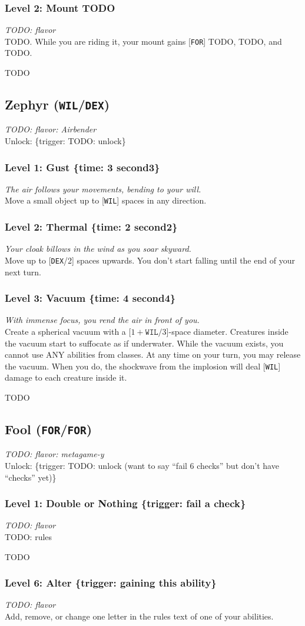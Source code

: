 \documentclass[12pt]{article}
\newcommand{\DEX}{\texttt{DEX}}
\newcommand{\WIL}{\texttt{WIL}}
\newcommand{\FOR}{\texttt{FOR}}
\newcommand{\TIME}[1]{\{time: #1 second\if1#1{}\else{s}\fi\}}
\newcommand{\TRIG}[1]{\{trigger: #1\}}
\newcommand{\Class}[4]{\pagebreak\subsection{#1 (#2)}\label{#1}\textit{#3}\\[1mm]Unlock: \TRIG{#4}}
\newcommand{\Skill}[5]{\subsubsection{Level #1: #2 #3}\textit{#4}\\[1mm]#5}
\begin{document}
\Skill{2}{Mount}{TODO}
{TODO: flavor}
{TODO. While you are riding it, your mount gains [\FOR] TODO, TODO, and TODO.}

TODO

%

%

%

%

%

%

%

%

%

%

%

%

%

%

%

%

%

%

%

%

\Class{Zephyr}{\WIL/\DEX}
{TODO: flavor: Airbender}
{TODO: unlock}

\Skill{1}{Gust}{\TIME{3}}
{The air follows your movements, bending to your will.}
{Move a small object up to [\WIL] spaces in any direction.}

\Skill{2}{Thermal}{\TIME{2}}
{Your cloak billows in the wind as you soar skyward.}
{Move up to [\DEX/2] spaces upwards. You don't start falling until the end of your next turn.}

\Skill{3}{Vacuum}{\TIME{4}}
{With immense focus, you rend the air in front of you.}
{Create a spherical vacuum with a [$1 + \WIL / 3$]-space diameter. Creatures inside the vacuum start to suffocate as if underwater. While the vacuum exists, you cannot use ANY abilities from classes. At any time on your turn, you may release the vacuum. When you do, the shockwave from the implosion will deal [\WIL] damage to each creature inside it.}

TODO

%

%

%

%

%

%

%

%

%

%

\Class{Fool}{\FOR/\FOR}
{TODO: flavor: metagame-y}
{TODO: unlock (want to say ``fail 6 checks'' but don't have ``checks'' yet)}

\Skill{1}{Double or Nothing}{\TRIG{fail a check}}
{TODO: flavor}
{TODO: rules}

TODO

\Skill{6}{Alter}{\TRIG{gaining this ability}}
{TODO: flavor}
{Add, remove, or change one letter in the rules text of one of your abilities.}
\end{document}
